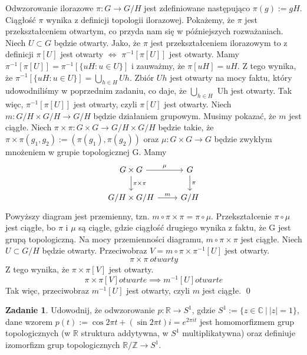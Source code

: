 \documentclass{article}
\theoremstyle{definition}%
\theoremstyle{theorem}
\newtheorem{zad}{Zadanie}
\renewenvironment{proof}{{\bfseries Rozwiązanie}}{\qed}
\newcommand{\R}{\mathbb{R}} %
\newcommand{\Z}{\mathbb{Z}}
\newcommand{\C}{\mathbb{C}}
\begin{document}
\begin{proof}
Odwzorowanie ilorazowe $\pi : G\to G/H$ jest zdefiniowane następująco $\pi(g):=gH$. Ciągłość $\pi$ wynika z definicji topologii ilorazowej. Pokażemy, że $\pi$ jest przekształceniem otwartym, co przyda nam się w późniejszych rozważaniach. Niech $U\subset G$ będzie otwarty. Jako, że $\pi$ jest przekształceniem ilorazowym to z definicji $\pi[U]$ jest otwarty $\Longleftrightarrow$ $\pi^{-1}[\pi[U]]$ jest otwarty. 
Mamy $\pi^{-1}[\pi[U]]=\pi^{-1}[\{uH:u\in U\}]$ i zauważmy, że $\pi[uH]=uH$. Z tego wynika, że $\pi^{-1}[\{uH:u\in U\}]=\bigcup_{h\in H} Uh$. Zbiór $Uh$ jest otwarty na mocy faktu, który udowodniliśmy w poprzednim zadaniu, co daje, że $\bigcup_{h\in H}$ Uh jest otwarty. Tak więc, $\pi^{-1}[\pi[U]]$ jest otwarty, czyli $\pi[U]$ jest otwarty.
Niech $m:G/H\times G/H\to G/H$ będzie działaniem grupowym. Musimy pokazać, że $m$ jest ciągłe. Niech $\pi\times\pi:G\times G\to G/H\times G/H$ będzie takie, że $\pi\times\pi (g_1,g_2):=(\pi (g_1), \pi (g_2))$ oraz $\mu :G\times G\to G$ będzie zwykłym mnożeniem w grupie topologicznej G. Mamy
\[
  \begin{tikzcd}
	G\times G \arrow[r, "\mu"] \arrow[d, "\pi\times\pi"]  
		& G \arrow[d, "\pi"] \\
	G/H\times G/H \arrow[r, "m"]
		& G/H
\end{tikzcd}
\]
Powyższy diagram jest przemienny, tzn. $m\circ\pi\times\pi=\pi\circ\mu$. Przekształcenie $\pi\circ\mu$ jest ciągłe, bo $\pi$ i $\mu$ są ciągłe, gdzie ciągłość drugiego wynika z faktu, że G jest grupą topologiczną. Na mocy przemienności diagramu, $m\circ\pi\times\pi$ jest ciągłe. Niech $U\subset G/H$ będzie otwarty. Przeciwobraz $V=m\circ\pi\times\pi^{-1} [U]$ jest otwarty. $$\pi\times\pi\ otwarty$$ Z tego wynika, że $\pi\times\pi[V]$ jest otwarty. $$ \pi\times\pi[V] otwarte \implies m^{-1}[U] otwarte$$ Tak więc, przeciwobraz $m^{-1}[U]$ jest otwarty, czyli $m$ jest ciągłe.
\end{proof}
\begin{zad}
Udowodnij, że odwzorowanie  $p:\R\to S^1$, gdzie $S^1:=\{z\in\C\ |\ |z|=1\}$, dane wzorem $p(t) := \cos 2\pi t + (\sin  2\pi t)i  = e^{2\pi it} $ jest homomorfizmem grup  topologicznych (w $\R$ struktura addytywna, w $S^1$ multiplikatywna) oraz  definiuje izomorfizm grup topologicznych $\R/\Z \to S^1$.
\end{zad}
\end{document}
